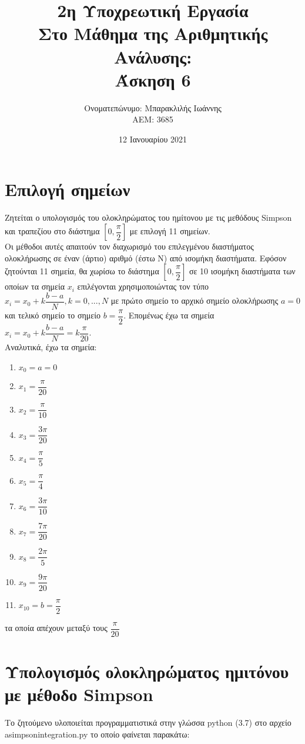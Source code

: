 \documentclass[a4paper,11pt]{article}
\title{2η Υποχρεωτική Εργασία \\ Στο Μάθημα της Αριθμητικής Ανάλυσης: \\ Άσκηση 6}
\author{Ονοματεπώνυμο: Μπαρακλιλής Ιωάννης  \\  ΑΕΜ: 3685}
\date{12 Ιανουαρίου 2021}
\newcommand{\lt}{\latintext}
\newcommand{\gt}{\greektext}
\begin{document}
\maketitle
\section{Επιλογή σημείων}
Ζητείται ο υπολογισμός του ολοκληρώματος του ημίτονου με τις μεθόδους {\lt Simpson} και τραπεζίου στο διάστημα $[0, \dfrac{\pi}{2}]$ με επιλογή 11 σημείων.\\
Οι μέθοδοι αυτές απαιτούν τον διαχωρισμό του επιλεγμένου διαστήματος ολοκλήρωσης σε έναν (άρτιο) αριθμό (έστω Ν) από ισομήκη διαστήματα. Εφόσον ζητούνται 11 σημεία, θα χωρίσω το διάστημα $[0, \dfrac{\pi}{2}]$ σε 10 ισομήκη διαστήματα των οποίων τα σημεία {\lt $x_i$} επιλέγονται χρησιμοποιώντας τον τύπο {\lt $x_i = x_0 + k\dfrac{b-a}{N}, k = 0,...,N$} με πρώτο σημείο το αρχικό σημείο ολοκλήρωσης {\lt $a = 0$} και τελικό σημείο το σημείο {\lt $b = \dfrac{\pi}{2}$}. Επομένως έχω τα σημεία {\lt $x_i = x_0 + k\dfrac{b-a}{N} = k\dfrac{\pi}{20}$}.\\
Αναλυτικά, έχω τα σημεία:
\lt
\begin{enumerate}
    \item $x_0 = a = 0$
    \item $x_1 = \dfrac{\pi}{20}$
    \item $x_2 = \dfrac{\pi}{10}$
    \item $x_3 = \dfrac{3\pi}{20}$
    \item $x_4 = \dfrac{\pi}{5}$
    \item $x_5 = \dfrac{\pi}{4}$
    \item $x_6 = \dfrac{3\pi}{10}$
    \item $x_7 = \dfrac{7\pi}{20}$
    \item $x_8 = \dfrac{2\pi}{5}$
    \item $x_9 = \dfrac{9\pi}{20}$
    \item $x_{10} = b = \dfrac{\pi}{2}$
\end{enumerate}
\gt
τα οποία απέχουν μεταξύ τους {\lt $\dfrac{\pi}{20}$}

\section{Υπολογισμός ολοκληρώματος ημιτόνου με μέθοδο {\lt Simpson}}
Το ζητούμενο υλοποιείται προγραμματιστικά στην γλώσσα {\lt python} (3.7) στο αρχείο {\lt a\textunderscore simpson\textunderscore integration.py} το οποίο φαίνεται παρακάτω:\\
\end{document}
